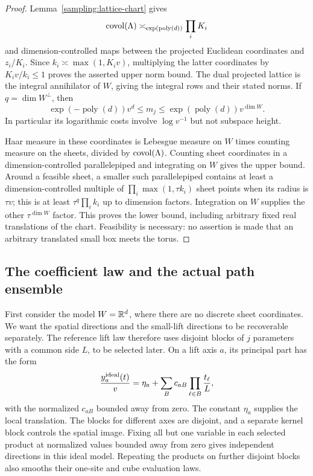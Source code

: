 \begin{proof}
Lemma~\ref{sampling:lattice-chart} gives
\[
 \operatorname{covol}(\Lambda)\asymp_{\exp(\operatorname{poly}(d))}\prod_iK_i
\]
and dimension-controlled maps between the projected Euclidean
coordinates and $z_i/K_i$.  Since
$k_i\asymp\max(1,K_i v)$, multiplying the latter coordinates by
$K_i v/k_i\le1$ proves the asserted upper norm bound.  The dual
projected lattice is the integral annihilator of $W$, giving the
integral rows and their stated norms.  If $q=\dim W^\perp$, then
\[
 \exp(-\operatorname{poly}(d))v^d
       \le m_j\le \exp(\operatorname{poly}(d))v^{\dim W}.
\]
In particular its logarithmic costs involve $\log v^{-1}$ but not
subspace height.

Haar measure in these coordinates is Lebesgue measure on $W$ times
counting measure on the sheets, divided by $\operatorname{covol}(\Lambda)$.
Counting sheet coordinates in a dimension-controlled parallelepiped
and integrating on $W$ gives the upper bound.  Around a feasible
sheet, a smaller such parallelepiped contains at least a
dimension-controlled multiple of $\prod_i\max(1,\tau k_i)$ sheet
points when its radius is $\tau v$; this is at least
$\tau^q\prod_i k_i$ up to dimension factors.  Integration on $W$
supplies the other $\tau^{\dim W}$ factor.  This proves the lower
bound, including arbitrary fixed real translations of the chart.
Feasibility is necessary: no assertion is made that an arbitrary
translated small box meets the torus.
\end{proof}

\subsection{The coefficient law and the actual path ensemble}

First consider the model $W=\mathbb R^d$, where there are no discrete
sheet coordinates. We want the spatial directions and the small-lift
directions to be recoverable separately. The reference lift law
therefore uses disjoint blocks of $j$ parameters with a common
side $L$, to be selected later. On a lift axis $a$, its principal
part has the form
\[
 \frac{y_a^{\rm ideal}(t)}v=\eta_a+
       \sum_B c_{aB}\prod_{\ell\in B}\frac{t_\ell}{L},
\]
with the normalized $c_{aB}$ bounded away from zero. The constant
$\eta_a$ supplies the local translation. The blocks for different
axes are disjoint, and a separate kernel block controls the spatial
image. Fixing all but one variable in each selected product at
normalized values bounded away from zero gives independent
directions in this ideal model. Repeating the products
on further disjoint blocks also smooths their one-site and cube
evaluation laws.


